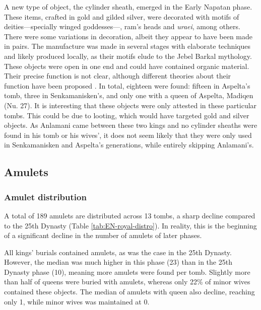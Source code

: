 A new type of object, the cylinder sheath, emerged in the Early Napatan phase. These items, crafted in gold and gilded silver, were decorated with motifs of deities---specially winged goddesses---, ram's heads and \textit{uraei}, among others. There were some variations in decoration, albeit they appear to have been made in pairs. The manufacture was made in several stages with elaborate techniques and likely produced locally, as their motifs elude to the Jebel Barkal mythology. These objects were open in one end and could have contained organic material. Their precise function is not clear, although different theories about their function have been proposed \parencites{gänsickeFreshLookCylinder2004, pompeiNapatanCylindricalSheaths2019}. In total,  eighteen were found: fifteen in Aspelta's tomb, three in  Senkamanisken's, and only one with a queen of Aspelta, Madiqen (Nu. 27). It is interesting that these objects were only attested in these particular tombs. This could be due to looting, which would have targeted gold and silver objects. As Anlamani came between these two kings and no cylinder sheaths were found in his tomb or his wives', it does not seem likely that they were only used in Senkamanisken and Aspelta's generations, while entirely skipping Anlamani's.


\subsection{Amulets}


\subsubsection{Amulet distribution}


A total of 189 amulets are distributed across 13 tombs, a sharp decline compared to the 25th Dynasty (Table \ref{tab:EN-royal-distro}). In reality, this is the beginning of a significant decline in the number of amulets of later phases.


All kings' burials contained amulets, as was the case in the 25th Dynasty. However, the median was much higher in this phase (23) than in the 25th Dynasty phase (10), meaning more amulets were found per tomb. Slightly more than half of queens were buried with amulets, whereas only 22\% of minor wives contained these objects. The median of amulets with queen also decline, reaching only 1, while minor wives was maintained at 0.


